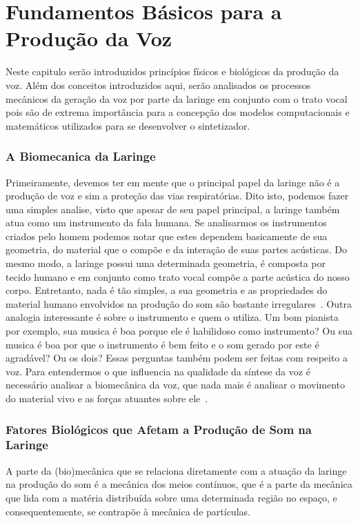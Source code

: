 \chapter{Fundamentos Básicos para a Produção da Voz}
	Neste capitulo serão introduzidos princípios físicos e biológicos da produção da voz. Além dos conceitos introduzidos aqui, serão analisados os processos mecânicos da geração da voz por parte da laringe em conjunto com o trato vocal pois são de extrema importância para a concepção dos modelos computacionais e matemáticos utilizados para se desenvolver o sintetizador.

	\subsection{A Biomecanica da Laringe}
	
	Primeiramente, devemos ter em mente que o principal papel da laringe não é a produção de voz e sim a proteção das vias respiratórias. Dito isto, podemos fazer uma simples analise, visto que apesar de seu papel principal, a laringe também atua como um instrumento da fala humana. Se analisarmos os instrumentos criados pelo homem podemos notar que estes dependem basicamente de sua geometria, do material que o compõe e da interação de suas partes acústicas. Do mesmo modo, a laringe possui uma determinada geometria, é composta por tecido humano e em conjunto como trato vocal compõe a parte acústica do nosso corpo. Entretanto, nada é tão simples, a sua geometria e as propriedades do material humano envolvidos na produção do som são bastante irregulares~\cite{IngoTitze}. Outra analogia interessante é sobre o instrumento e quem o utiliza. Um bom pianista por exemplo, sua musica é boa porque ele é habilidoso como instrumento? Ou sua musica é boa por que o instrumento é bem feito e o som gerado por este é agradável? Ou os dois? Essas perguntas também podem ser feitas com respeito a voz. Para entendermos o que inﬂuencia na qualidade da síntese da voz é necessário analisar a biomecânica da voz, que nada mais é analisar o movimento do material vivo e as forças atuantes sobre ele~\cite{IngoTitze}.
	
	\subsection{Fatores Biológicos que Afetam a Produção de Som na Laringe}
	A parte da (bio)mecânica que se relaciona diretamente com a atuação da laringe na produção do som é a mecânica dos meios contínuos, que é a parte da mecânica que lida com a matéria distribuída sobre uma determinada região no espaço, e consequentemente, se contrapõe à mecânica de partículas. 
	
